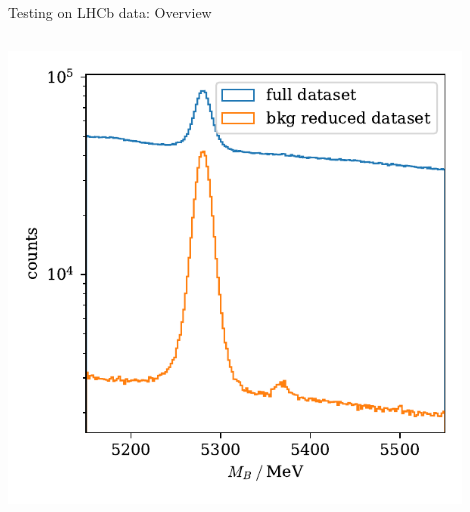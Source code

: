 \documentclass[aspectratio=1610, 10pt]{beamer}
\begin{document}
\begin{frame}{Testing on LHCb data: Overview}
\begin{columns}
\begin{column}{0.5\textwidth}
      \includegraphics[width=0.9\textwidth]{images/BKG_reduced.pdf}
    \end{column}
  \end{columns}  
\end{frame}
\end{document}

